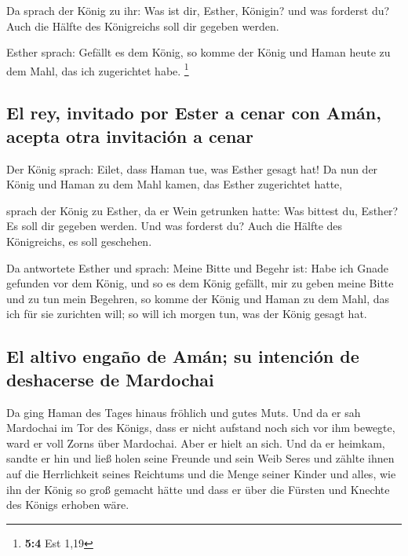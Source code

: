  Da sprach der König zu ihr: Was ist dir, Esther, Königin?
und was forderst du? Auch die Hälfte des Königreichs soll dir gegeben
werden.

 Esther sprach: Gefällt es dem König, so komme der König
und Haman heute zu dem Mahl, das ich zugerichtet habe. \footnote{\textbf{5:4}
  Est 1,19}

\hypertarget{el-rey-invitado-por-ester-a-cenar-con-amuxe1n-acepta-otra-invitaciuxf3n-a-cenar}{%
\subsection{El rey, invitado por Ester a cenar con Amán, acepta otra
invitación a
cenar}\label{el-rey-invitado-por-ester-a-cenar-con-amuxe1n-acepta-otra-invitaciuxf3n-a-cenar}}

 Der König sprach: Eilet, dass Haman tue, was Esther
gesagt hat! Da nun der König und Haman zu dem Mahl kamen, das Esther
zugerichtet hatte,

 sprach der König zu Esther, da er Wein getrunken hatte:
Was bittest du, Esther? Es soll dir gegeben werden. Und was forderst du?
Auch die Hälfte des Königreichs, es soll geschehen.

 Da antwortete Esther und sprach: Meine Bitte und Begehr
ist:  Habe ich Gnade gefunden vor dem König, und so es dem
König gefällt, mir zu geben meine Bitte und zu tun mein Begehren, so
komme der König und Haman zu dem Mahl, das ich für sie zurichten will;
so will ich morgen tun, was der König gesagt hat.

\hypertarget{el-altivo-engauxf1o-de-amuxe1n-su-intenciuxf3n-de-deshacerse-de-mardochai}{%
\subsection{El altivo engaño de Amán; su intención de deshacerse de
Mardochai}\label{el-altivo-engauxf1o-de-amuxe1n-su-intenciuxf3n-de-deshacerse-de-mardochai}}

 Da ging Haman des Tages hinaus fröhlich und gutes Muts.
Und da er sah Mardochai im Tor des Königs, dass er nicht aufstand noch
sich vor ihm bewegte, ward er voll Zorns über Mardochai. 
Aber er hielt an sich. Und da er heimkam, sandte er hin und ließ holen
seine Freunde und sein Weib Seres  und zählte ihnen auf
die Herrlichkeit seines Reichtums und die Menge seiner Kinder und alles,
wie ihn der König so groß gemacht hätte und dass er über die Fürsten und
Knechte des Königs erhoben wäre.

